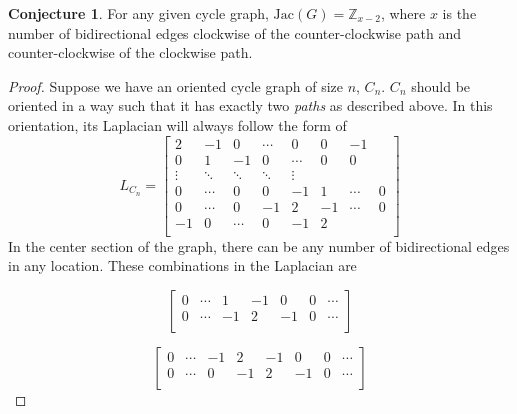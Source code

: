 \documentclass[11pt,reqno]{amsart}
\newcommand{\Jac}{\textrm{Jac}}{}
\theoremstyle{definition}
\newtheorem{conj}[mydef]{\textbf{Conjecture}}
\theoremstyle{plain}
\begin{document}
		\begin{conj}
			For any given cycle graph, $\Jac(G)=\mathbb{Z}_{x-2}$, where $x$ is the number of
			bidirectional edges clockwise of the counter-clockwise path and counter-clockwise of the clockwise path.
		\end{conj}
		\begin{proof}
			Suppose we have an oriented cycle graph of size $n$, $C_n$.  $C_n$ should be oriented in a way such that
			it has exactly two \textit{paths} as described above.  In this orientation, its Laplacian will always
			follow the form of
			\begin{equation}
				L_{C_n}=\left[\begin{array}{ccccccccc}
				2 & -1 & 0 & \cdots & 0 & 0 & -1 \\ \hline
				0 & 1 & -1 & 0 & \cdots & 0 & 0 \\
				\vdots & \ddots & \ddots & \ddots & \vdots \\
				0 & \cdots & 0 & 0 & -1 & 1 & \cdots & 0 \\ \hline
				0 & \cdots & 0 & -1 & 2 & -1 & \cdots & 0\\
				-1 & 0 & \cdots & 0 & -1 & 2\\
				\end{array}\right]
			\end{equation}
			In the center section of the graph, there can be any number of bidirectional edges in any location.
			These combinations in the Laplacian are \\
			\noindent\begin{minipage}{.5\linewidth}
				\begin{equation}
				  	\left[\begin{array}{cccccccc}
						0 & \cdots & 1 & -1 & 0 & 0 & \cdots \\
						0 & \cdots & -1 & 2 & -1 & 0 & \cdots \\
					\end{array}\right]
				\end{equation}
			\end{minipage}
			\begin{minipage}{.5\linewidth}
				\begin{equation}
					\left[\begin{array}{cccccccc}
						0 & \cdots & -1 & 2 & -1 & 0 & 0 & \cdots \\
						0 & \cdots & 0 & -1 & 2 & -1 & 0 & \cdots \\
					\end{array}\right]
				\end{equation}
			\end{minipage}


\end{proof}
\end{document}
